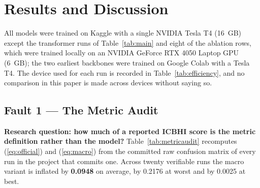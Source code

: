 \documentclass[journal,onecolumn]{IEEEtran}
\newcommand{\best}[1]{\textbf{#1}}
\begin{document}
\section{Results and Discussion}
\label{sec:results}

All models were trained on Kaggle with a single NVIDIA Tesla T4 (16~GB) except the
transformer runs of Table~\ref{tab:main} and eight of the ablation rows, which
were trained locally on an NVIDIA GeForce RTX 4050 Laptop GPU (6~GB); the two
earliest backbones were trained on Google Colab with a Tesla T4. The device used
for each run is recorded in Table~\ref{tab:efficiency}, and no comparison in this
paper is made across devices without saying so.

\subsection{Fault 1 --- The Metric Audit}
\label{subsec:metricaudit}

\textbf{Research question: how much of a reported ICBHI score is the metric
definition rather than the model?} Table~\ref{tab:metricaudit} recomputes
(\ref{eq:official}) and (\ref{eq:macro}) from the committed raw confusion matrix
of every run in the project that commits one. Across twenty verifiable runs the
macro variant is inflated by \best{0.0948} on average, by 0.2176 at worst and by
0.0025 at best.
\end{document}
